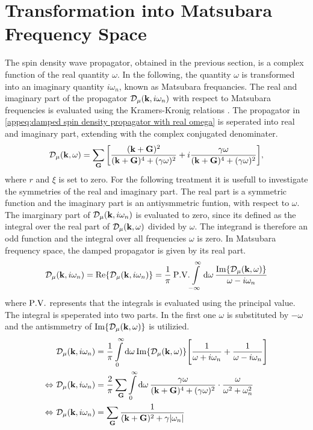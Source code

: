 \section{Transformation into Matsubara Frequency Space}
\label{appsec:transformation into Matsubara frequency space}
%
%
The spin density wave propagator, obtained in the previous section, is a complex function of the real quantity $\omega$.
In the following, the quantity $\omega$ is transformed into an imaginary quantity $i\omega_{n}$, known as Matsubara frequancies.
The real and imaginary part of the propagator $\mathcal{D}_{\mu}(\vb{k}, i\omega_{n})$ with respect to Matsubara frequencies is evaluated using the Kramers-Kronig relations \cite{Schwabl}.
The propagator in \eqref{appeq:damped spin density propagator with real omega} is seperated into real and imaginary part, extending with the complex conjugated denominater.
%
\begin{align}
	\mathcal{D}_{\mu}(\vb{k}, \omega) = \sum\limits_{\vb{G}} \bigg[\frac{(\vb{k}+\vb{G})^{2}}{(\vb{k}+\vb{G})^{4} + (\gamma\omega)^{2}} + i \frac{\gamma \omega}{(\vb{k}+\vb{G})^{4} + (\gamma\omega)^{2}}\bigg],
	\label{appeq:real and imaginary part of D}
\end{align}
%
where $r$ and $\xi$ is set to zero.
For the following treatment it is usefull to investigate the symmetries of the real and imaginary part.
The real part is a symmetric function and the imaginary part is an antiysmmetric funtion, with respect to $\omega$.
The imarginary part of $\mathcal{D}_{\mu}(\vb{k}, i\omega_{n})$ is evaluated to zero, since its defined as the integral over the real part of $\mathcal{D}_{\mu}(\vb{k}, \omega)$ divided by $\omega$.
The integrand is therefore an odd function and the integral over all frequencies $\omega$ is zero.
In Matsubara frequency space, the damped propagator is given by its real part.
%
\begin{align}
	\mathcal{D}_{\mu}(\vb{k}, i\omega_{n}) = \Re{\mathcal{D}_{\mu}(\vb{k}, i\omega_{n})} = \frac{1}{\pi}\: \PV{\int\limits_{-\infty}^{\infty} \dd{\omega} \frac{\Im{\mathcal{D}_{\mu}(\vb{k}, \omega)}}{\omega - i\omega_{n}}}
\end{align}
%
where $\PV$ represents that the integrals is evaluated using the principal value.
The integral is speperated into two parts. 
In the first one $\omega$ is substituted by $-\omega$ and the antismmetry of $\Im{\mathcal{D}_{\mu}(\vb{k}, \omega)}$ is utilizied.
%
\begin{align}
	&\mathcal{D}_{\mu}(\vb{k}, i\omega_{n}) = \frac{1}{\pi} \int\limits_{0}^{\infty} \dd{\omega} \Im{\mathcal{D}_{\mu}(\vb{k}, \omega)} \Bigg[
		\frac{1}{\omega + i\omega_{n}}
		+
		\frac{1}{\omega - i\omega_{n}}
	\Bigg]
	\notag \\
	\Leftrightarrow\ &\mathcal{D}_{\mu}(\vb{k}, i\omega_{n}) = 
		\frac{2}{\pi} \sum\limits_{\vb{G}} \int\limits_{0}^{\infty} \dd{\omega} 
		\frac{\gamma \omega}{(\vb{k}+\vb{G})^{4} + (\gamma\omega)^{2}} \cdot
		\frac{\omega}{\omega^{2} + \omega_{n}^{2}}
	\notag \\
	\Leftrightarrow\ &\mathcal{D}_{\mu}(\vb{k}, i\omega_{n}) = 
		\sum\limits_{\vb{G}} \frac{1}{(\vb{k}+\vb{G})^{2} + \gamma|\omega_{n}|}
	\label{eq: damped propagator Matsubara representation}
\end{align}
